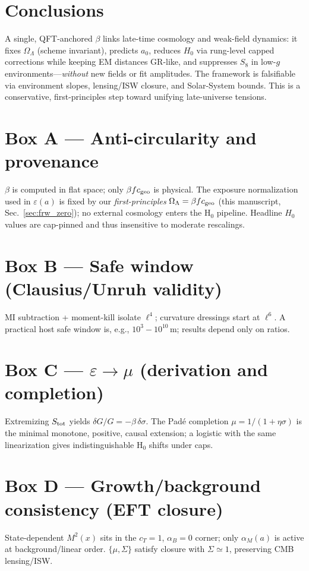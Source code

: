 \documentclass[aps,prd,preprint,onecolumn,longbibliography,nofootinbib]{revtex4-2}
\theoremstyle{plain}
\theoremstyle{remark}
\newcommand{\OmL}{\Omega_\Lambda}
\newcommand{\Hzero}{H_0}
\newcommand{\alM}{\alpha_{\!M}}
\newcommand{\alB}{\alpha_{\!B}}
\newcommand{\be}{\beta}
\newcommand{\Sig}{\Sigma} %
\newcommand{\eps}{\varepsilon}
\begin{document}
\section{Conclusions}
A single, QFT-anchored $\be$ links late-time cosmology and weak-field dynamics: it fixes $\OmL$ (scheme invariant), predicts $a_0$, reduces $\Hzero$ via rung-level capped corrections while keeping EM distances GR-like, and suppresses $S_8$ in low-$g$ environments—\emph{without} new fields or fit amplitudes. The framework is falsifiable via environment slopes, lensing/ISW closure, and Solar-System bounds. This is a conservative, first-principles step toward unifying late-universe tensions.

\section*{Box A — Anti-circularity and provenance}
$\be$ is computed in flat space; only $\be f c_{\rm geo}$ is physical. The exposure normalization used in $\eps(a)$ is fixed by our \emph{first-principles} $\OmL=\be f c_{\rm geo}$ (this manuscript, Sec.~\ref{sec:frw_zero}); no external cosmology enters the H$_0$ pipeline. Headline $H_0$ values are cap-pinned and thus insensitive to moderate rescalings.

\section*{Box B — Safe window (Clausius/Unruh validity)}
MI subtraction + moment-kill isolate $\ell^4$; curvature dressings start at $\ell^6$. A practical host safe window is, e.g., $10^3\!-\!10^{10}$\,m; results depend only on ratios.

\section*{Box C — $\eps\!\to\!\mu$ (derivation and completion)}
Extremizing $S_{\rm tot}$ yields $\delta G/G=-\be\,\delta\sigma$. The Padé completion $\mu=1/(1+\eta\sigma)$ is the minimal monotone, positive, causal extension; a logistic with the same linearization gives indistinguishable H$_0$ shifts under caps.

\section*{Box D — Growth/background consistency (EFT closure)}
State-dependent $M^2(x)$ sits in the $c_T\!=\!1$, $\alB\!=\!0$ corner; only $\alM(a)$ is active at background/linear order. $\{\mu,\Sig\}$ satisfy closure with $\Sig\simeq 1$, preserving CMB lensing/ISW.
\end{document}
